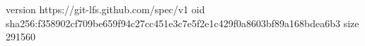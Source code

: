 version https://git-lfs.github.com/spec/v1
oid sha256:f358902cf709be659f94c27cc451e3c7e5f2e1c429f0a8603bf89a168bdea6b3
size 291560
